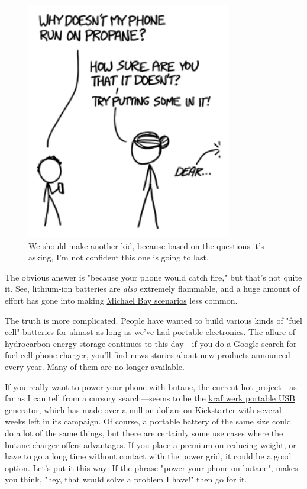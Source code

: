 {\begin{figure}[!htbp]
\centering
\includegraphics[scale=0.5, max width=0.8\textwidth]{imgs/a/128/why.png}
\caption{We should make another kid, because based on the questions it's asking, I'm not confident this one is going to last.}
\end{figure}

{The obvious answer is "because your phone would catch fire," but that's not quite it. See, lithium-ion batteries are \emph{also} extremely flammable, and a huge amount of effort has gone into making \href{https://www.youtube.com/results?search\_query=lithium+ion+battery+explosion}{Michael Bay scenarios} less common.}

{The truth is more complicated. People have wanted to build various kinds of "fuel cell" batteries for almost as long as we've had portable electronics. The allure of hydrocarbon energy storage continues to this day—if you do a Google search for \href{https://www.google.com/search?q=fuel+cell+phone+charger}{fuel cell phone charger}, you'll find news stories about new products announced every year. Many of them are \href{http://www.forbes.com/sites/michaelkanellos/2013/01/31/why-are-portable-fuel-cells-such-a-flop/} {no longer available}.}

{If you really want to power your phone with butane, the current hot project—as far as I can tell from a cursory search—seems to be the \href{https://www.kickstarter.com/projects/265641170/kraftwerk-highly-innovative-portable-power-plant}{kraftwerk portable USB generator}, which has made over a million dollars on Kickstarter with several weeks left in its campaign. Of course, a portable battery of the same size could do a lot of the same things, but there are certainly some use cases where the butane charger offers advantages. If you place a premium on reducing weight, or have to go a long time without contact with the power grid, it could be a good option. Let's put it this way: If the phrase "power your phone on butane", makes you think, "hey, that would solve a problem I have!" then go for it.}

}
